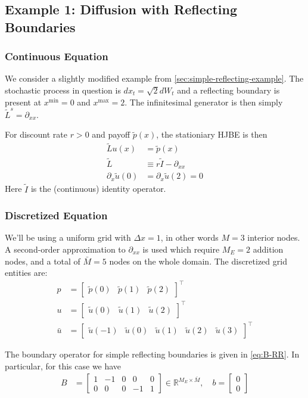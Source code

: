 \documentclass[11pt]{article}
\newcommand{\R}{\ensuremath{\mathbb{R}}}
\newcommand{\D}[1][]{\ensuremath{\partial_{#1}}}
\begin{document}
\subsection{Example 1: Diffusion with Reflecting Boundaries}\label{sec:appendixA-example1}
\subsubsection{Continuous Equation}
We consider a slightly modified example from \cref{sec:simple-reflecting-example}. The stochastic process in question is $dx_t = \sqrt{2}dW_t$ and a reflecting boundary is present at $x^{\min} = 0$ and $x^{\max} = 2$. The infinitesimal generator is then simply $\tilde{L}^s = \D[xx]$.

For discount rate $r > 0$ and payoff $\tilde{p}(x)$, the stationiary HJBE is then
\begin{align}
	\tilde{L}u(x) &= \tilde{p}(x)\\
	\tilde{L} &\equiv r\tilde{I} - \D[xx] \\
	\D[x]\tilde{u}(0) &= \D[x]\tilde{u}(2) = 0
\end{align}
Here $\tilde{I}$ is the (continuous) identity operator.

\subsubsection{Discretized Equation}
We'll be using a uniform grid with $\Delta x = 1$, in other words $M = 3$ interior nodes. A second-order approximation to $\D[xx]$ is used which require $M_E = 2$ addition nodes, and a total of $\bar{M} = 5$ nodes on the whole domain. The discretized grid entities are:
\begin{align}
	p &= \begin{bmatrix} \tilde{p}(0) & \tilde{p}(1) & \tilde{p}(2)\end{bmatrix}^{\top}\\
	u &= \begin{bmatrix} \tilde{u}(0) & \tilde{u}(1) & \tilde{u}(2)\end{bmatrix}^{\top}\\
	\bar{u} &= \begin{bmatrix} \tilde{u}(-1)  & \tilde{u}(0) & \tilde{u}(1) & \tilde{u}(2) &  \tilde{u}(3)\end{bmatrix}^{\top}
\end{align}

The boundary operator for simple reflecting boundaries is given in \cref{eq:B-RR}. In particular, for this case we have
\begin{align}
	B &= \begin{bmatrix}
			1 & -1 & 0 & 0 & 0\\
			0 & 0 & 0 & -1 & 1
		 \end{bmatrix}\in\R^{M_E \times \bar{M}},\quad
	b = \begin{bmatrix}0 \\ 0\end{bmatrix}
\end{align}
\end{document}
